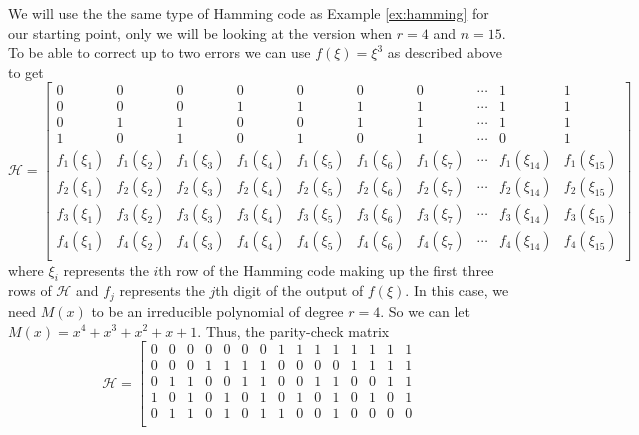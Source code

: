 \begin{example}\label{ex:2BCH}
    We will use the the same type of Hamming code as Example \ref{ex:hamming} for our starting point, only we will be looking at the version when $r = 4$ and $n = 15$. To be able to correct up to two errors we can use $f(\xi) = \xi^3$ as described above to get
    \[
        \mathscr{H} = 
        \left[\begin{array}{cccccccccc}
            0 & 0 & 0 & 0 & 0 & 0 & 0 & \cdots & 1 & 1\\
            0 & 0 & 0 & 1 & 1 & 1 & 1 & \cdots & 1 & 1\\
            0 & 1 & 1 & 0 & 0 & 1 & 1 & \cdots & 1 & 1\\
            1 & 0 & 1 & 0 & 1 & 0 & 1 & \cdots & 0 & 1\\
            f_1(\xi_1) & f_1(\xi_2) & f_1(\xi_3) & f_1(\xi_4) &f_1(\xi_5) & f_1(\xi_6) & f_1(\xi_7) & \cdots & f_1(\xi_{14}) & f_1(\xi_{15})\\
            f_2(\xi_1) & f_2(\xi_2) & f_2(\xi_3) & f_2(\xi_4) &f_2(\xi_5) & f_2(\xi_6) & f_2(\xi_7) & \cdots & f_2(\xi_{14}) & f_2(\xi_{15})\\
            f_3(\xi_1) & f_3(\xi_2) & f_3(\xi_3) & f_3(\xi_4) &f_3(\xi_5) & f_3(\xi_6) & f_3(\xi_7) & \cdots & f_3(\xi_{14}) & f_3(\xi_{15})\\
            f_4(\xi_1) & f_4(\xi_2) & f_4(\xi_3) & f_4(\xi_4) &f_4(\xi_5) & f_4(\xi_6) & f_4(\xi_7) & \cdots & f_4(\xi_{14}) & f_4(\xi_{15})\\
        \end{array}\right]
    \]
    where $\xi_i$ represents the $i$th row of the Hamming code making up the first three rows of $\mathscr{H}$ and $f_j$ represents the $j$th digit of the output of $f(\xi)$. In this case, we need $M(x)$ to be an irreducible polynomial of degree $r = 4$. So we can let $M(x) = x^4 + x^3 + x^2 + x + 1$. Thus, the parity-check matrix
    \[
        \mathscr{H} = 
        \left[\begin{array}{ccccccccccccccc}
            0 & 0 & 0 & 0 & 0 & 0 & 0 & 1 & 1 & 1 & 1 & 1 & 1 & 1 & 1\\
            0 & 0 & 0 & 1 & 1 & 1 & 1 & 0 & 0 & 0 & 0 & 1 & 1 & 1 & 1\\
            0 & 1 & 1 & 0 & 0 & 1 & 1 & 0 & 0 & 1 & 1 & 0 & 0 & 1 & 1\\
            1 & 0 & 1 & 0 & 1 & 0 & 1 & 0 & 1 & 0 & 1 & 0 & 1 & 0 & 1\\
            0 & 1 & 1 & 0 & 1 & 0 & 1 & 1 & 0 & 0 & 1 & 0 & 0 & 0 & 0\\

\end{array}\]
\end{example}
